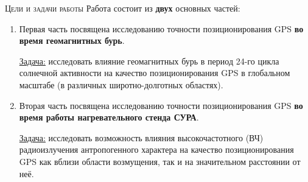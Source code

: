 \begin{frame}{\textsc{Цели и задачи работы}}
Работа состоит из \textbf{двух} основных частей:
\begin{enumerate}
\justifying
\item Первая часть посвящена исследованию точности позиционирования GPS \textbf{во время геомагнитных бурь}.  

\underline{Задача:} исследовать влияние геомагнитных бурь в период 24-го цикла солнечной активности на качество позиционирования GPS в глобальном масштабе (в различных широтно-долготных областях).
\item Вторая часть посвящена исследованию точности позиционирования GPS \textbf{во время работы нагревательного стенда СУРА}.

\underline{Задача:} исследовать возможность влияния высокочастотного (ВЧ) радиоизлучения антропогенного характера на качество позиционирования GPS как вблизи области возмущения, так и на значительном расстоянии от неё.
\end{enumerate}
\end{frame}